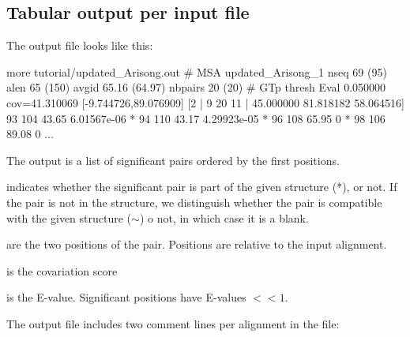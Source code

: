 
\subsection{Tabular output per input file}

The output file  looks like this:

\begin{sreoutput}
more tutorial/updated_Arisong.out 
# MSA updated_Arisong_1 nseq 69 (95) alen 65 (150) avgid 65.16 (64.97) nbpairs 20 (20)
# GTp thresh Eval 0.050000 cov=41.310069 [-9.744726,89.076909] [2 | 9 20 11 | 45.000000 81.818182 58.064516] 
                93             104      43.65   6.01567e-06
*               94             110      43.17   4.29923e-05
*               96             108      65.95   0
*               98             106      89.08   0
...
\end{sreoutput}
The output is a list of significant pairs ordered by the first positions. \\

\begin{sreitems}{}
\item[\emprog{First column}] indicates whether the significant pair is
  part of the given structure (*), or not.  If the pair is not in the
  structure, we distinguish whether the pair is compatible with the
  given structure ($\sim$) o not, in which case it is a blank.

\item[\emprog{Second and third columns}] are the two positions of the
  pair. Positions are relative to the input alignment.

\item[\emprog{Forth column}] is the covariation score

\item[\emprog{Fifth column}] is the E-value. Significant positions
  have E-values $<< 1$.
\end{sreitems}

The output file  includes two
comment lines per alignment in the file:

